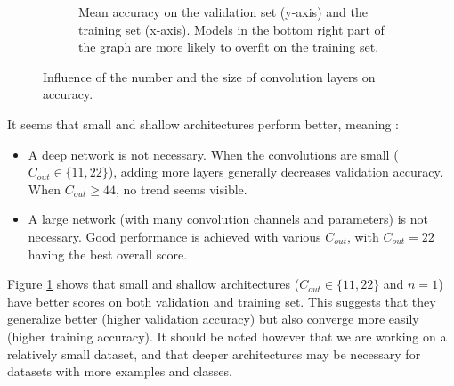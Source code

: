 \documentclass{article}
\begin{document}
\begin{figure}
\begin{subfigure}{0.45\linewidth}
        \caption{Mean accuracy on the validation set (y-axis) and the training set (x-axis). Models in the bottom right part of the graph are more likely to overfit on the training set.}
        \label{fig:scatter-conv-layers-nb-size}            
    \end{subfigure}
    \caption{Influence of the number and the size of convolution layers on accuracy.}
    \label{fig:conv-size}
\end{figure}
\par
It seems that small and shallow architectures perform better, meaning :
\begin{itemize}
    \item A deep network is not necessary. When the convolutions are small ($C_{out} \in \{11, 22\}$), adding more layers generally decreases validation accuracy. When $C_{out} \geq 44$, no trend seems visible.
    \item A large network (with many convolution channels and parameters) is not necessary. Good performance is achieved with various $C_{out}$, with $C_{out}=22$ having the best overall score.
\end{itemize}
Figure \ref{fig:scatter-conv-layers-nb-size} shows that small and shallow architectures ($C_{out} \in \{11, 22\}$ and $n=1$) have better scores on both validation and training set. This suggests that they generalize better (higher validation accuracy) but also converge more easily (higher training accuracy).
It should be noted however that we are working on a relatively small dataset, and that deeper architectures may be necessary for datasets with more examples and classes.
\end{document}
